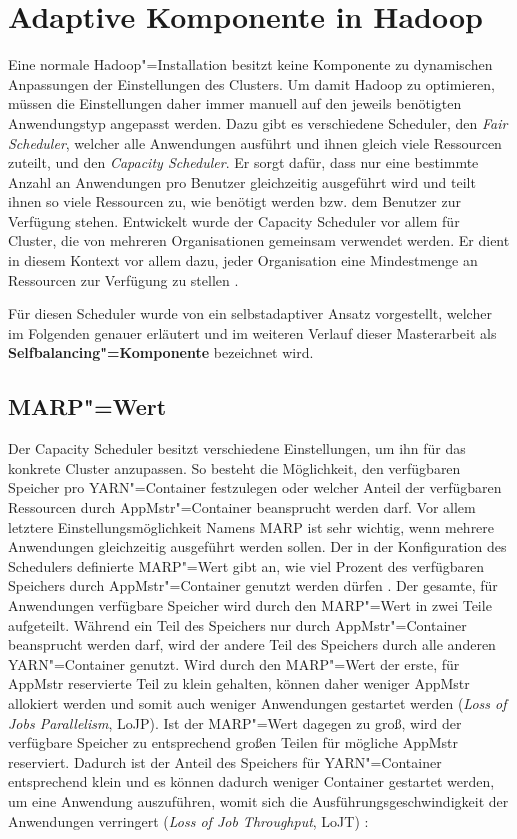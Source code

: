 \section{Adaptive Komponente in Hadoop}
\label{sec:inriaSetting}

Eine normale Hadoop"=Installation besitzt keine Komponente zu dynamischen Anpassungen der Einstellungen des Clusters.
Um damit Hadoop zu optimieren, müssen die Einstellungen daher immer manuell auf den jeweils benötigten Anwendungstyp angepasst werden.
Dazu gibt es \uA verschiedene Scheduler, den \emph{Fair Scheduler}, welcher alle Anwendungen ausführt und ihnen gleich viele Ressourcen zuteilt, und den \emph{Capacity Scheduler}.
Er sorgt dafür, dass nur eine bestimmte Anzahl an Anwendungen pro Benutzer gleichzeitig ausgeführt wird und teilt ihnen so viele Ressourcen zu, wie benötigt werden bzw. dem Benutzer zur Verfügung stehen.
Entwickelt wurde der Capacity Scheduler vor allem für Cluster, die von mehreren Organisationen gemeinsam verwendet werden.
Er dient in diesem Kontext vor allem dazu, jeder Organisation eine Mindestmenge an Ressourcen zur Verfügung zu stellen \cite{HadoopCapScheduler271}.

Für diesen Scheduler wurde von \citeauthor{Zhang2016} ein selbstadaptiver Ansatz \cite{Zhang2016} vorgestellt, welcher im Folgenden genauer erläutert und im weiteren Verlauf dieser Masterarbeit als \textbf{Selfbalancing"=Komponente} bezeichnet wird.

\subsection{MARP"=Wert}
\label{subsec:selfbalancingMarp}

Der Capacity Scheduler besitzt verschiedene Einstellungen, um ihn für das konkrete Cluster anzupassen.
So besteht \zB die Möglichkeit, den verfügbaren Speicher pro YARN"=Container festzulegen oder welcher Anteil der verfügbaren Ressourcen durch \gls{AppMstr}"=Container beansprucht werden darf.
Vor allem letztere Einstellungsmöglichkeit Namens \gls{MARP} ist sehr wichtig, wenn mehrere Anwendungen gleichzeitig ausgeführt werden sollen.
Der in der Konfiguration des Schedulers definierte \gls{MARP}"=Wert gibt an, wie viel Prozent des verfügbaren Speichers durch \gls{AppMstr}"=Container genutzt werden dürfen \cite{HadoopCapScheduler271}.
Der gesamte, für Anwendungen verfügbare Speicher wird durch den \gls{MARP}"=Wert in zwei Teile aufgeteilt.
Während ein Teil des Speichers nur durch \gls{AppMstr}"=Container beansprucht werden darf, wird der andere Teil des Speichers durch alle anderen YARN"=Container genutzt.
Wird durch den \gls{MARP}"=Wert der erste, für \gls{AppMstr} reservierte Teil zu klein gehalten, können daher weniger \gls{AppMstr} allokiert werden und somit auch weniger Anwendungen gestartet werden (\emph{Loss of Jobs Parallelism}, LoJP).
Ist der \gls{MARP}"=Wert dagegen zu groß, wird der verfügbare Speicher zu entsprechend großen Teilen für mögliche \gls{AppMstr} reserviert.
Dadurch ist der Anteil des Speichers für YARN"=Container entsprechend klein und es können dadurch weniger Container gestartet werden, um eine Anwendung auszuführen, womit sich die Ausführungsgeschwindigkeit der Anwendungen verringert (\emph{Loss of Job Throughput}, LoJT) \cite{Zhang2016}:


